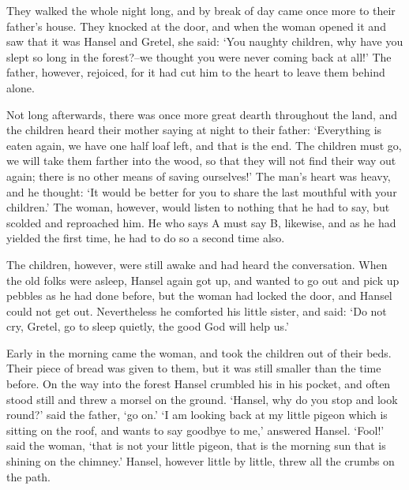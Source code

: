 \documentclass[oneside,10pt]{memoir} %
\begin{document}
They walked the whole night long, and by break of day came once more to their father's house. They knocked at the door, and when the woman opened it and saw that it was Hansel and Gretel, she said: `You naughty children, why have you slept so long in the forest?--we thought you were never coming back at all!' The father, however, rejoiced, for it had cut him to the heart to leave them behind alone.

Not long afterwards, there was once more great dearth throughout the land, and the children heard their mother saying at night to their father: `Everything is eaten again, we have one half loaf left, and that is the end. The children must go, we will take them farther into the wood, so that they will not find their way out again; there is no other means of saving ourselves!' The man's heart was heavy, and he thought: `It would be better for you to share the last mouthful with your children.' The woman, however, would listen to nothing that he had to say, but scolded and reproached him. He who says A must say B, likewise, and as he had yielded the first time, he had to do so a second time also.

The children, however, were still awake and had heard the conversation. When the old folks were asleep, Hansel again got up, and wanted to go out and pick up pebbles as he had done before, but the woman had locked the door, and Hansel could not get out. Nevertheless he comforted his little sister, and said: `Do not cry, Gretel, go to sleep quietly, the good God will help us.'

Early in the morning came the woman, and took the children out of their beds. Their piece of bread was given to them, but it was still smaller than the time before. On the way into the forest Hansel crumbled his in his pocket, and often stood still and threw a morsel on the ground. `Hansel, why do you stop and look round?' said the father, `go on.' `I am looking back at my little pigeon which is sitting on the roof, and wants to say goodbye to me,' answered Hansel. `Fool!' said the woman, `that is not your little pigeon, that is the morning sun that is shining on the chimney.' Hansel, however little by little, threw all the crumbs on the path.
\end{document}
